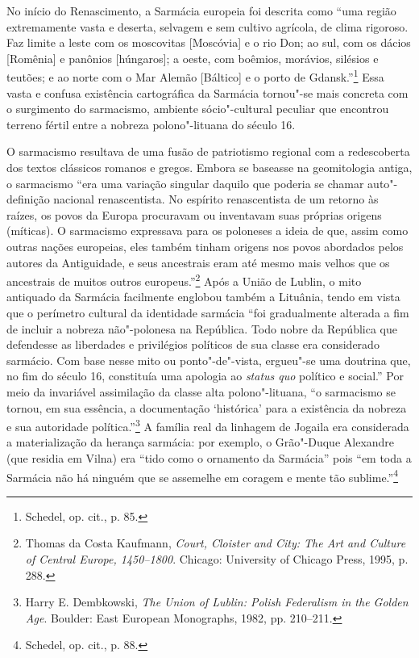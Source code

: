 No início do Renascimento, a Sarmácia europeia foi descrita como ``uma
região extremamente vasta e deserta, selvagem e sem cultivo agrícola, de
clima rigoroso. Faz limite a leste com os moscovitas {[}Moscóvia{]} e o
rio Don; ao sul, com os dácios {[}Romênia{]} e panônios {[}húngaros{]};
a oeste, com boêmios, morávios, silésios e teutões; e ao norte com o Mar
Alemão {[}Báltico{]} e o porto de Gdansk.''\footnote{Schedel, op. cit., p. 85.} Essa vasta e confusa existência cartográfica da Sarmácia tornou"-se mais concreta com o surgimento do sarmacismo, ambiente
sócio"-cultural peculiar que encontrou terreno fértil entre a nobreza
polono"-lituana do século 16.

O sarmacismo resultava de uma fusão de patriotismo regional com a
redescoberta dos textos clássicos romanos e gregos. Embora se baseasse
na geomitologia antiga, o sarmacismo ``era uma variação singular daquilo
que poderia se chamar auto"-definição nacional renascentista. No espírito
renascentista de um retorno às raízes, os povos da Europa procuravam ou
inventavam suas próprias origens (míticas). O sarmacismo expressava para
os poloneses a ideia de que, assim como outras nações europeias, eles
também tinham origens nos povos abordados pelos autores da Antiguidade,
e seus ancestrais eram até mesmo mais velhos que os ancestrais de muitos
outros europeus.''\footnote{Thomas da Costa Kaufmann, \textit{Court, Cloister and City: The Art and Culture of Central Europe, 1450--1800}. Chicago: University of Chicago Press, 1995, p. 288.} Após a União de Lublin, o mito antiquado da Sarmácia facilmente englobou também a
Lituânia, tendo em vista que o perímetro cultural da identidade sarmácia
``foi gradualmente alterada a fim de incluir a nobreza não"-polonesa na
República. Todo nobre da República que defendesse as liberdades e
privilégios políticos de sua classe era considerado sarmácio. Com base
nesse mito ou ponto"-de"-vista, ergueu"-se uma doutrina que, no fim do
século 16, constituía uma apologia ao \textit{status quo} político e
social.'' Por meio da invariável assimilação da classe alta
polono"-lituana, ``o sarmacismo se tornou, em sua essência, a
documentação `histórica' para a existência da nobreza e sua autoridade
política.''\footnote{Harry E. Dembkowski, \textit{The Union of Lublin: Polish Federalism in the Golden Age}. Boulder: East European Monographs, 1982, pp. 210--211.} A família real da linhagem de Jogaila era considerada a materialização da herança sarmácia: por exemplo, o
Grão"-Duque Alexandre (que residia em Vilna) era ``tido como o ornamento
da Sarmácia'' pois ``em toda a Sarmácia não há ninguém que se assemelhe
em coragem e mente tão sublime.''\footnote{Schedel, op. cit., p. 88.}

